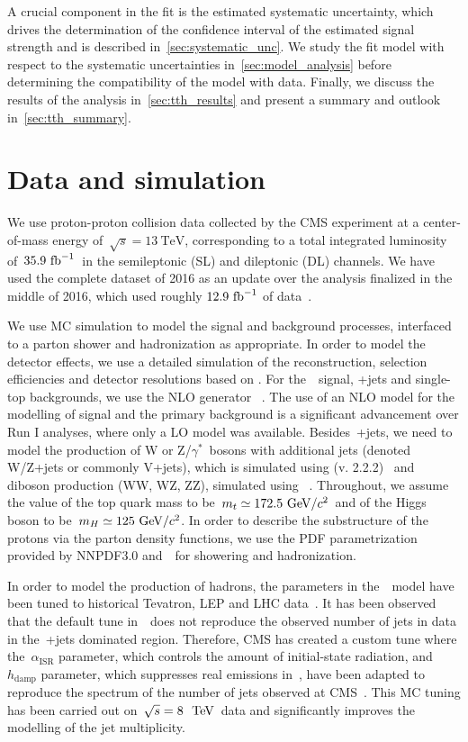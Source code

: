 A crucial component in the fit is the estimated systematic uncertainty, which drives the determination of the confidence interval of the estimated signal strength and is described in~\cref{sec:systematic_unc}. We study the fit model with respect to the systematic uncertainties in~\cref{sec:model_analysis} before determining the compatibility of the model with data. Finally, we discuss the results of the analysis in~\cref{sec:tth_results} and present a summary and outlook in~\cref{sec:tth_summary}.

\section{Data and simulation}
\label{sec:data_mc}

We use proton-proton collision data collected by the CMS experiment at a center-of-mass energy of~$\sqrt{s} = 13~\mathrm{TeV}$, corresponding to a total integrated luminosity of~$35.9~\mathrm{fb}^{-1}$~in the semileptonic (SL) and dileptonic (DL) channels. We have used the complete dataset of 2016 as an update over the analysis finalized in the middle of 2016, which used roughly $12.9~\mathrm{fb}^{-1}$ of data~\cite{CMS:2016zbb}.

We use MC simulation to model the signal and background processes, interfaced to a parton shower and hadronization as appropriate. In order to model the detector effects, we use a detailed simulation of the reconstruction, selection efficiencies and detector resolutions based on \geant. For the~\ttH~signal, \ttbar+jets and single-top backgrounds, we use the NLO generator \powheg~\cite{Frixione:2007vw,Re:2010bp}. The use of an NLO model for the modelling of signal and the primary background is a significant advancement over Run I analyses, where only a LO model was available. Besides~\ttbar+jets, we need to model the production of W or Z/$\gamma^*$~bosons with additional jets (denoted W/Z+jets or commonly V+jets), which is simulated using \madgraphatnlo (v. 2.2.2)~\cite{Hirschi:2011pa} and diboson production (WW, WZ, ZZ), simulated using \pythia~\cite{Sjostrand:2007gs}. Throughout, we assume the value of the top quark mass to be~$m_t \simeq 172.5~\mathrm{GeV}/c^2$~and of the Higgs boson to be~$m_H \simeq 125~\mathrm{GeV}/c^2$. In order to describe the substructure of the protons via the parton density functions, we use the PDF parametrization provided by NNPDF3.0 and~\pythia~for showering and hadronization.

In order to model the production of hadrons, the parameters in the~\pythia~model have been tuned to historical Tevatron, LEP and LHC data~\cite{CMS-PAS-GEN-14-001,Skands:2014pea}. It has been observed that the default tune in~\pythia~does not reproduce the observed number of jets in data in the~\ttbar+jets dominated region. Therefore, CMS has created a custom tune where the~$\alpha_{\mathrm{ISR}}$ parameter, which controls the amount of initial-state radiation, and~$h_{\mathrm{damp}}$ parameter, which suppresses real emissions in~\powheg, have been adapted to reproduce the spectrum of the number of jets observed at CMS~\cite{CMS-PAS-TOP-16-021}. This MC tuning has been carried out on~$\sqrt{s} = 8~~\mathrm{TeV}$~data and significantly improves the modelling of the jet multiplicity.

